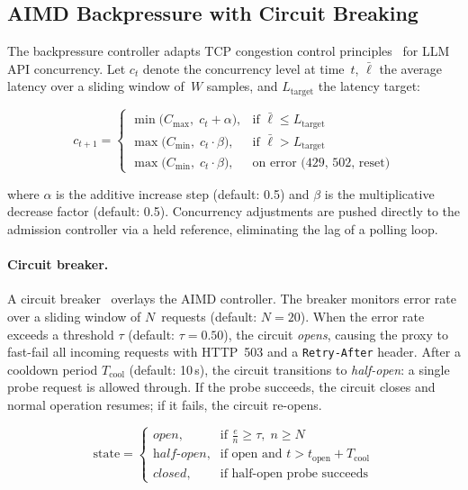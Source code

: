 \documentclass[11pt,twocolumn]{article}
\begin{document}
\subsection{AIMD Backpressure with Circuit Breaking}
\label{sec:aimd}

The backpressure controller adapts TCP congestion control
principles~\cite{jacobson1988congestion,chiu1989aimd} for LLM
API concurrency.  Let $c_t$ denote the concurrency level at
time~$t$, $\bar{\ell}$ the average latency over a sliding window
of~$W$ samples, and $L_{\text{target}}$ the latency target:

\begin{equation}
\label{eq:aimd}
c_{t+1} =
\begin{cases}
  \min\bigl(C_{\max},\; c_t + \alpha\bigr),
    & \text{if } \bar{\ell} \leq L_{\text{target}} \\[4pt]
  \max\bigl(C_{\min},\; c_t \cdot \beta\bigr),
    & \text{if } \bar{\ell} > L_{\text{target}} \\[4pt]
  \max\bigl(C_{\min},\; c_t \cdot \beta\bigr),
    & \text{on error (429, 502, reset)}
\end{cases}
\end{equation}

\noindent where $\alpha$ is the additive increase step
(default: 0.5) and $\beta$ is the multiplicative decrease factor
(default: 0.5).  Concurrency adjustments are pushed directly to
the admission controller via a held reference, eliminating the
lag of a polling loop.

\paragraph{Circuit breaker.}
A circuit breaker~\cite{nygard2018release} overlays the AIMD
controller.  The breaker monitors error rate over a sliding
window of $N$~requests (default: $N = 20$).  When the error rate
exceeds a threshold $\tau$ (default: $\tau = 0.50$), the circuit
\emph{opens}, causing the proxy to fast-fail all incoming
requests with HTTP~503 and a \texttt{Retry-After} header.
After a cooldown period $T_{\text{cool}}$ (default: 10\,s), the
circuit transitions to \emph{half-open}: a single probe request
is allowed through.  If the probe succeeds, the circuit closes
and normal operation resumes; if it fails, the circuit re-opens.

\begin{equation}
\label{eq:circuit}
\text{state} =
\begin{cases}
  \textit{open},      & \text{if } \frac{e}{n} \geq \tau,\; n \geq N \\
  \textit{half-open}, & \text{if open and } t > t_{\text{open}} + T_{\text{cool}} \\
  \textit{closed},    & \text{if half-open probe succeeds}
\end{cases}
\end{equation}
\end{document}
